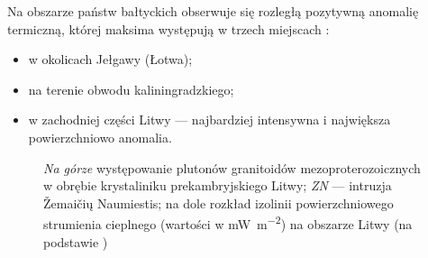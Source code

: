 \documentclass[11.5pt,twoside]{report}
\begin{document}
  	
  	
  	
  	
Na obszarze państw bałtyckich obserwuje się rozległą pozytywną anomalię termiczną, której maksima występują w trzech miejscach \parencite{Lukosevicius.1993}:

\begin{itemize}
	\item w okolicach Jełgawy (Łotwa);
	\item na terenie obwodu kaliningradzkiego;
	\item w zachodniej części Litwy --- najbardziej intensywna i największa powierzchniowo anomalia.
\end{itemize}

\begin{figure}[h]
	\centering
	\caption{\textit{Na górze} występowanie plutonów granitoidów mezoproterozoicznych w obrębie krystaliniku prekambryjskiego Litwy; \textit{ZN} --- intruzja Žemaičių Naumiestis; {na dole} rozkład izolinii powierzchniowego strumienia cieplnego (wartości w \si{\milli\watt\per\meter\squared}) na obszarze Litwy (na podstawie \cite{Sliaupa.2010})}
	\label{litwa}
\end{figure}
\end{document}
